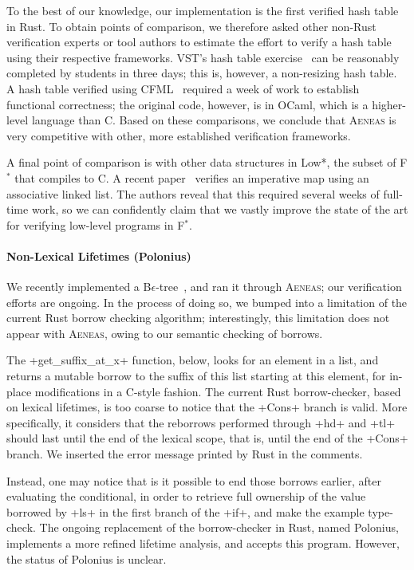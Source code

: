 \documentclass[acmsmall,screen]{acmart}
\newif\iflong
\newcommand{\aeneas}{\textsc{Aeneas}\xspace}
\newcommand{\fstar}{F$^\ast$\xspace}
\newcommand\myparagraph[1]{\emph{#1}.\ }
\let\myparagraph\paragraph
\begin{document}
To the best of our knowledge, our implementation is the first verified hash
table in Rust. To obtain points of comparison, we therefore asked other non-Rust
verification experts or tool authors to estimate the effort to verify a hash
table using their respective frameworks. VST's hash table
exercise~\cite{appel2016verifiable} can be reasonably completed by students in
three days; this is, however, a non-resizing hash table. A hash table verified
using CFML~\cite{pottier2017verifying} required a week of work to establish
functional correctness; the original code, however, is in OCaml, which is a
higher-level language than C. Based on these comparisons, we conclude that
\aeneas is very competitive with other, more established verification
frameworks.

A final point of comparison is with other data structures in Low*, the subset of \fstar that compiles to C. A recent
paper~\cite{ho2021noise} verifies an imperative map using an associative linked
list. The authors reveal that this required several weeks of full-time work,
so we can confidently claim that we vastly improve the state of the art for
verifying low-level programs in \fstar.

\myparagraph{Non-Lexical Lifetimes (Polonius)}
We recently implemented a B$\epsilon$-tree~\cite{betree}, and ran it through
\aeneas; our verification efforts are ongoing.
In the process of doing so, we bumped into a limitation of the current Rust borrow checking
algorithm; interestingly, this limitation does not appear with \aeneas, owing to our semantic checking
of borrows.

\iflong
The \li+get_suffix_at_x+ function, below, looks for an element in a list, and returns a mutable borrow to
the suffix of this list starting at this element, for in-place modifications in a C-style
fashion. The current Rust borrow-checker, based on lexical lifetimes, is too
coarse to notice that the \li+Cons+ branch is valid. More specifically, it considers
that the reborrows performed through \li+hd+ and \li+tl+ should last until the end of the lexical
scope, that is, until the end
of the \li+Cons+ branch. We inserted the
error message printed by Rust in the comments.

Instead, one may notice that is it possible to end those borrows earlier,
after evaluating the conditional, in order to retrieve full
ownership of the value borrowed by \li+ls+ in the first branch of the \li+if+, and make the example
type-check. The ongoing replacement of the borrow-checker in Rust, named Polonius, implements a more
refined lifetime analysis, and accepts this program. However, the status of Polonius is unclear.
\end{document}
